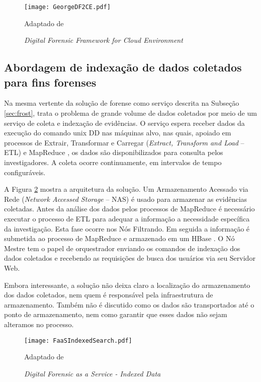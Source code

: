 \begin{figure}[htb!]
\footnotesize
\caption{\textit{Digital Forensic Framework for Cloud Environment}}
\texttt{[image: GeorgeDF2CE.pdf]}
\centering
\label{fig:GeorgeDF2CE}
\begin{center}
Adaptado de \cite{GeorgeDF2CE:2012} 
\end{center}
\end{figure}


\subsection{Abordagem de indexação de dados coletados para fins forenses}
\label{sec:indexacaoforense}

Na mesma vertente da solução de forense como serviço descrita na Subseção \ref{sec:frost}, \cite{FaaSIndexedSearch:2012} trata o problema de grande volume de dados coletados por meio de um serviço de coleta e indexação de evidências.
%
O serviço espera receber dados da execução do comando unix DD \cite{UnixManPagesDD} nas máquinas alvo, nas quais, apoiado em processos de Extrair, Transformar e Carregar (\textit{Extract, Transform and Load} -- ETL) e MapReduce \cite{MapReduce:2008}, os dados são disponibilizados para consulta pelos investigadores.
%
A coleta ocorre continuamente, em intervalos de tempo configuráveis.


A Figura \ref{fig:FaaSIndexedSearch} mostra a arquitetura da solução. Um Armazenamento Acessado via Rede (\textit{Network Accessed Storage} -- NAS) é usado para armazenar as evidências coletadas.
%
Antes da análise dos dados pelos processos de MapReduce é necessário executar o processo de ETL para adequar a informação a necessidade específica da investigação. Esta fase ocorre nos Nós Filtrando.
%
Em seguida a informação é submetida ao processo de MapReduce e armazenado em um HBase \cite{Hbase2018}.
%
O Nó Mestre tem o papel de orquestrador enviando os comandos de indexação dos dados coletados e recebendo as requisições de busca dos usuários via seu Servidor Web.


Embora interessante, a solução não deixa claro a localização do armazenamento dos dados coletados, nem quem é responsável pela infraestrutura de armazenamento.
%
Também não é discutido como os dados são transportados até o ponto de armazenamento, nem como garantir que esses dados não sejam alteramos no processo.
%


\begin{figure}[htb!]
\footnotesize
\caption{\textit{Digital Forensic as a Service - Indexed Data}}
\texttt{[image: FaaSIndexedSearch.pdf]}
\centering
\label{fig:FaaSIndexedSearch}
\begin{center}
Adaptado de \cite{FaaSIndexedSearch:2012} 
\end{center}
\end{figure}


